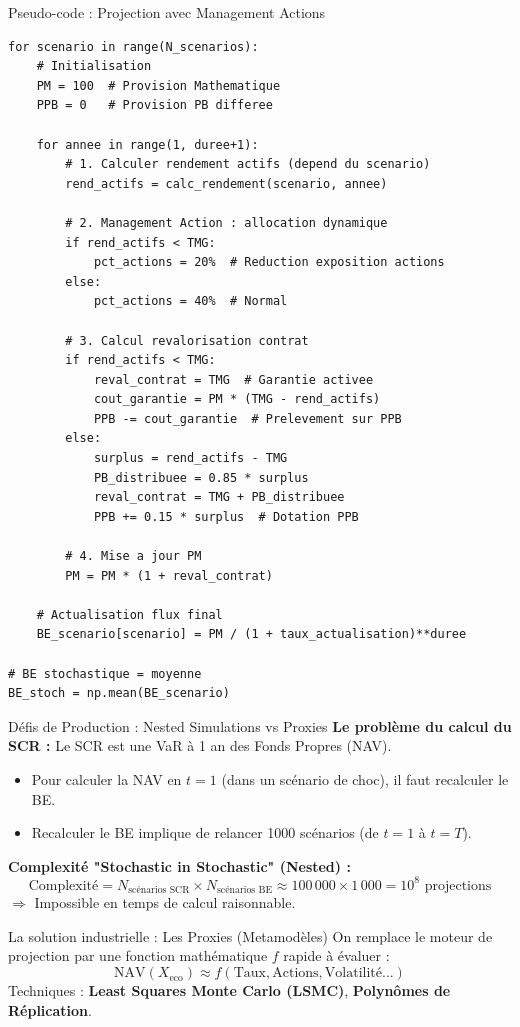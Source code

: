 \documentclass[10pt,aspectratio=169,xcolor={dvipsnames}]{beamer}
\begin{document}
\begin{frame}[fragile]{Pseudo-code : Projection avec Management Actions}
\begin{lstlisting}[style=pythonstyle, basicstyle=\ttfamily\tiny]
for scenario in range(N_scenarios):
    # Initialisation
    PM = 100  # Provision Mathematique
    PPB = 0   # Provision PB differee
    
    for annee in range(1, duree+1):
        # 1. Calculer rendement actifs (depend du scenario)
        rend_actifs = calc_rendement(scenario, annee)
        
        # 2. Management Action : allocation dynamique
        if rend_actifs < TMG:
            pct_actions = 20%  # Reduction exposition actions
        else:
            pct_actions = 40%  # Normal
        
        # 3. Calcul revalorisation contrat
        if rend_actifs < TMG:
            reval_contrat = TMG  # Garantie activee
            cout_garantie = PM * (TMG - rend_actifs)
            PPB -= cout_garantie  # Prelevement sur PPB
        else:
            surplus = rend_actifs - TMG
            PB_distribuee = 0.85 * surplus
            reval_contrat = TMG + PB_distribuee
            PPB += 0.15 * surplus  # Dotation PPB
        
        # 4. Mise a jour PM
        PM = PM * (1 + reval_contrat)
    
    # Actualisation flux final
    BE_scenario[scenario] = PM / (1 + taux_actualisation)**duree

# BE stochastique = moyenne
BE_stoch = np.mean(BE_scenario)
\end{lstlisting}
\end{frame}

\begin{frame}{Défis de Production : Nested Simulations vs Proxies}
\textbf{Le problème du calcul du SCR :}
Le SCR est une VaR à 1 an des Fonds Propres (NAV).
\begin{itemize}
    \item Pour calculer la NAV en $t=1$ (dans un scénario de choc), il faut recalculer le BE.
    \item Recalculer le BE implique de relancer 1000 scénarios (de $t=1$ à $t=T$).
\end{itemize}

\vspace{0.2cm}
\textbf{Complexité "Stochastic in Stochastic" (Nested) :}
\[ \text{Complexité} = N_{\text{scénarios SCR}} \times N_{\text{scénarios BE}} \approx 100\,000 \times 1\,000 = 10^8 \text{ projections} \]
$\Rightarrow$ \alert{Impossible} en temps de calcul raisonnable.

\vspace{0.3cm}
\begin{block}{La solution industrielle : Les Proxies (Metamodèles)}
On remplace le moteur de projection par une fonction mathématique $f$ rapide à évaluer :
\[ \text{NAV}(X_{\text{eco}}) \approx f(\text{Taux}, \text{Actions}, \text{Volatilité}...) \]
Techniques : \textbf{Least Squares Monte Carlo (LSMC)}, \textbf{Polynômes de Réplication}.
\end{block}
\end{frame}
\end{document}
